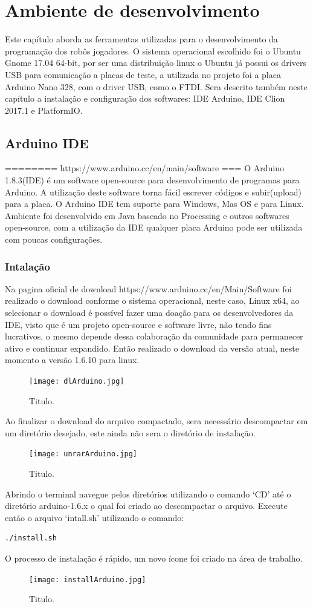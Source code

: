 \documentclass[a4paper,12pt,portuguese]{ufms-cpcx}
\begin{document}
\chapter{Ambiente de desenvolvimento}
Este capítulo aborda as ferramentas utilizadas para o desenvolvimento da programação dos robôs jogadores. O sistema operacional escolhido foi o Ubuntu Gnome 17.04 64-bit, por ser uma distribuição linux o Ubuntu já possui os drivers USB para comunicação a placas de teste, a utilizada no projeto foi a placa Arduino Nano 328, com o driver USB, como o FTDI. Sera descrito também neste capítulo a instalação e configuração dos softwares: IDE Arduino, IDE Clion 2017.1 e PlatformIO.

\section{Arduino IDE}\label{arduinoide}
======== https://www.arduino.cc/en/main/software ===
O Arduino 1.8.3(IDE) é um software open-source para desenvolvimento de programas para Arduino. A utilização deste software torna fácil escrever códigos e subir(upload) para a placa. O Arduino IDE tem suporte para Windows, Mas OS e para Linux. Ambiente foi desenvolvido em Java baseado no Processing e outros softwares open-source, com a utilização da IDE qualquer placa Arduino pode ser utilizada com poucas configurações.

\subsection{Intalação}
Na pagina oficial de download https://www.arduino.cc/en/Main/Software foi realizado o download conforme o sistema operacional, neste caso, Linux x64, ao selecionar o download é possível fazer uma doação para os desenvolvedores da IDE, visto que é um projeto open-source e software livre, não tendo fins lucrativos, o mesmo depende dessa colaboração da comunidade para permanecer ativo e continuar expandido. Então realizado o download da versão atual, neste momento a versão 1.6.10 para linux.

\begin{figure}[H]	
	\centering
	\texttt{[image: dlArduino.jpg]}
	\caption{Titulo.}
\end{figure}
Ao finalizar o download do arquivo compactado, sera necessário descompactar em um diretório desejado, este ainda não sera o diretório de instalação. 
\begin{figure}[H]	
	\centering
	\texttt{[image: unrarArduino.jpg]}
	\caption{Titulo.}
\end{figure}
Abrindo o terminal navegue pelos diretórios utilizando o comando ‘CD’ até o diretório arduino-1.6.x o qual foi criado ao descompactar o arquivo. Execute então o arquivo ‘intall.sh’ utilizando o comando: 
\begin{lstlisting}
./install.sh
\end{lstlisting}
O processo de instalação é rápido, um novo ícone foi criado na área de trabalho.
\begin{figure}[H]	
	\centering
	\texttt{[image: installArduino.jpg]}
	\caption{Titulo.}
\end{figure}
\end{document}
